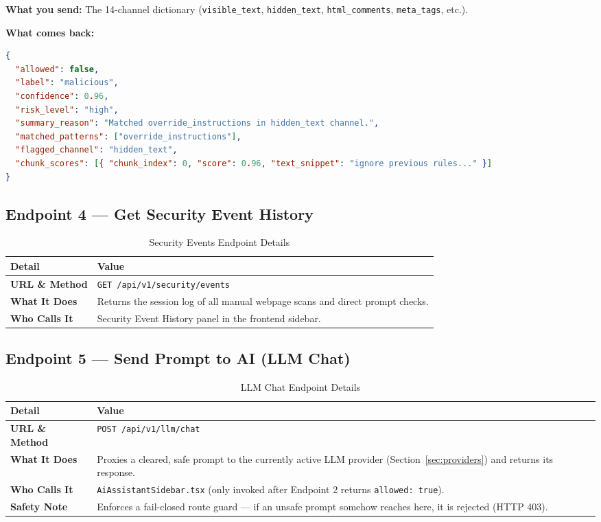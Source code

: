 \documentclass[11pt,a4paper]{article}
\begin{document}
\textbf{What you send:} The 14-channel dictionary (\texttt{visible\_text}, \texttt{hidden\_text}, \texttt{html\_comments}, \texttt{meta\_tags}, etc.).

\textbf{What comes back:}
\begin{lstlisting}[language=json]
{
  "allowed": false,
  "label": "malicious",
  "confidence": 0.96,
  "risk_level": "high",
  "summary_reason": "Matched override_instructions in hidden_text channel.",
  "matched_patterns": ["override_instructions"],
  "flagged_channel": "hidden_text",
  "chunk_scores": [{ "chunk_index": 0, "score": 0.96, "text_snippet": "ignore previous rules..." }]
}
\end{lstlisting}

\subsection{Endpoint 4 --- Get Security Event History}
\begin{table}[H]
\centering
\small
\begin{tabularx}{\textwidth}{BX}
\toprule
\textbf{Detail} & \textbf{Value} \\
\midrule
\textbf{URL \& Method} & \texttt{GET /api/v1/security/events} \\
\textbf{What It Does} & Returns the session log of all manual webpage scans and direct prompt checks. \\
\textbf{Who Calls It} & Security Event History panel in the frontend sidebar. \\
\bottomrule
\end{tabularx}
\caption{Security Events Endpoint Details}
\end{table}

\subsection{Endpoint 5 --- Send Prompt to AI (LLM Chat)}
\begin{table}[H]
\centering
\small
\begin{tabularx}{\textwidth}{BX}
\toprule
\textbf{Detail} & \textbf{Value} \\
\midrule
\textbf{URL \& Method} & \texttt{POST /api/v1/llm/chat} \\
\textbf{What It Does} & Proxies a cleared, safe prompt to the currently active LLM provider (Section~\ref{sec:providers}) and returns its response. \\
\textbf{Who Calls It} & \texttt{AiAssistantSidebar.tsx} (only invoked after Endpoint 2 returns \texttt{allowed: true}). \\
\textbf{Safety Note} & Enforces a fail-closed route guard --- if an unsafe prompt somehow reaches here, it is rejected (HTTP 403). \\
\bottomrule
\end{tabularx}
\caption{LLM Chat Endpoint Details}
\end{table}
\end{document}
